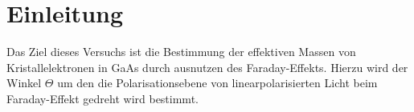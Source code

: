 \section{Einleitung}
Das Ziel dieses Versuchs ist die Bestimmung der effektiven Massen von Kristallelektronen in GaAs durch ausnutzen des Faraday-Effekts. Hierzu wird der Winkel $\Theta$ um den die Polarisationsebene von linearpolarisierten Licht beim Faraday-Effekt gedreht wird bestimmt.
